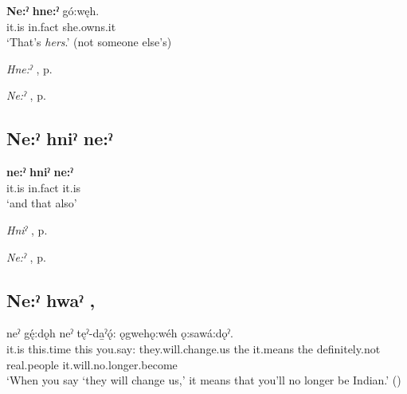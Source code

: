 \ea
\label{ex:npar80}
\gll \textbf{Ne:ˀ} \textbf{hne:ˀ} gó:węh.\\
it.is in.fact she.owns.it\\
\glt ‘That’s \emph{hers}.’ (not someone else’s)
\z

\begin{CayugaRelated}
\item \textit{Hne:ˀ} , p. \pageref{p:[hne:ˀ] ‘in fact’}\\
\item \textit{Ne:ˀ} , p. \pageref{p:[ne:ˀ] `it is’}
\end{CayugaRelated}

\subsection*{\textbf{Ne:ˀ hniˀ ne:ˀ} } \label{p:[ne:ˀ hniˀ ne:ˀ]}

\ea
\label{ex:npar81}
\gll \textbf{ne:ˀ} \textbf{hniˀ} \textbf{ne:ˀ}\\
it.is in.fact it.is\\
\glt ‘and that also’
\z

\begin{CayugaRelated}
\item \textit{Hniˀ} , p. \pageref{p:[hniˀ] ‘and’}\\
\item \textit{Ne:ˀ} , p. \pageref{p:[ne:ˀ] `it is’}
\end{CayugaRelated}


\subsection*{\textbf{Ne:ˀ hwaˀ} , } \label{p:[ne:ˀ hwaˀ]}

\ea
\label{ex:npar85}
 neˀ gę́:dǫh neˀ tęˀ-da̱ˀǫ́: ǫgwehǫ:wéh ǫ:sawá:dǫˀ. \\
it.is this.time this you.say: they.will.change.us the it.means the definitely.not real.people it.will.no.longer.become\\
\glt ‘When you say ‘they will change us,’ it means that you’ll no longer be Indian.’ (\cite{henry_de_2005})
\z

